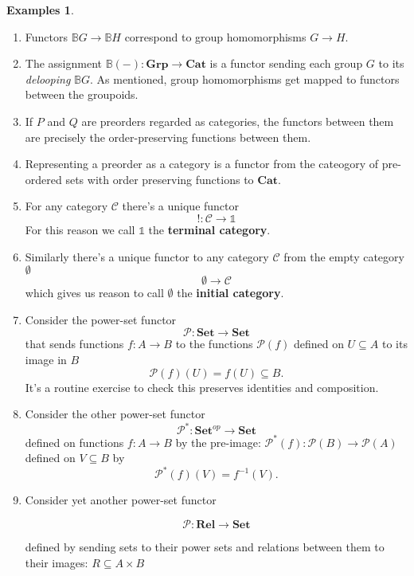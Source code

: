 \documentclass[11pt]{amsart}
\theoremstyle{plain}
\theoremstyle{definition}
\newtheorem*{egs*}{Examples}
\newcommand{\mB}{{\mathbb B}}
\newcommand{\cP}{{\mathcal P}}
\newcommand{\cC}{{\mathcal C}}
\newcommand{\Rel}{\mathbf{Rel}}
\newcommand{\Cat}{\mathbf{Cat}}
\newcommand{\Set}{{\mathbf{Set}}}
\newcommand{\Grp}{\mathbf{Grp}}
\newcommand{\noi}{{\noindent}}
\begin{document}
\begin{egs*}\
\begin{enumerate}
\item Functors $\mB G \to \mB H$ correspond to group homomorphisms $G \to H$. \medskip

\item The assignment $\mB(-) : \Grp \to \Cat$ is a functor sending each group $G$ to its \textit{delooping} $\mB G$. As mentioned, group homomorphisms get mapped to functors between the groupoids.  \medskip

\item If $P$ and $Q$ are preorders regarded as categories, the functors between them are precisely the order-preserving functions between them. \medskip 

\item Representing a preorder as a category is a functor from the cateogory of pre-ordered sets with order preserving functions to $\Cat$. \medskip 

\item For any category $\cC$ there's a unique functor 
\[ ! : \cC \to \mathbb{1} \]
\noi For this reason we call $\mathbb{1}$ the \textbf{terminal category}. \medskip 

\item Similarly there's a unique functor to any category $\cC$ from the empty category $\emptyset$
\[ \emptyset \to \cC \]
\noi which gives us reason to call $\emptyset$ the \textbf{initial category}. \medskip 

\item Consider the power-set functor
\[ \cP : \Set \to \Set \] 
\noi that sends functions $f : A \to B$ to the functions $\cP(f)$ defined on $U \subseteq A$ to its image in $B$
\[ \cP(f)(U) = f(U) \subseteq B . \]
\noi It's a routine exercise to check this preserves identities and composition. \medskip

\item Consider the other power-set functor 
\[ \cP^* : \Set^{op} \to \Set \]
\noi defined on functions $f : A \to B$ by the pre-image: $\cP^*(f) : \cP(B) \to \cP(A)$ defined on $V \subseteq B$ by 
\[ \cP^*(f) (V) = f^{-1}(V).\]\medskip 

\item Consider yet another power-set functor

\[ \cP : \Rel \to \Set \]

\noi defined by sending sets to their power sets and relations between them to their images: $R \subseteq A \times B$ 


\end{enumerate}
\end{egs*}
\end{document}

